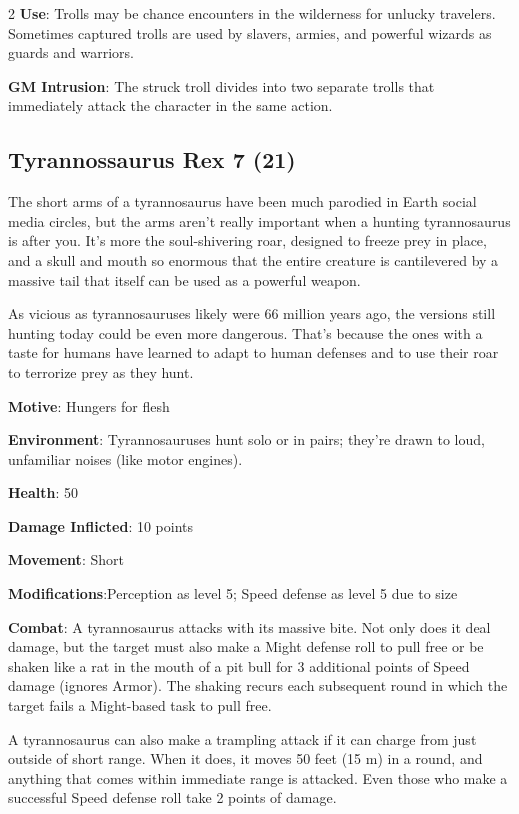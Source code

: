 \begin{multicols}{2}
\textbf{Use}: Trolls may be chance encounters in the wilderness for unlucky travelers. Sometimes captured trolls are used by slavers, armies, and powerful wizards as guards and warriors.

\textbf{GM Intrusion}: The struck troll divides into two separate trolls that immediately attack the character in the same action.

\subsection{Tyrannossaurus Rex 7 (21)}

The short arms of a tyrannosaurus have been much parodied in Earth social media circles, but the arms aren’t really important when a hunting tyrannosaurus is after you. It’s more the soul-shivering roar, designed to freeze prey in place, and a skull and mouth so enormous that the entire creature is cantilevered by a massive tail that itself can be used as a powerful weapon.

As vicious as tyrannosauruses likely were 66 million years ago, the versions still hunting today could be even more dangerous. That’s because the ones with a taste for humans have learned to adapt to human defenses and to use their roar to terrorize prey as they hunt.

\textbf{Motive}: Hungers for flesh

\textbf{Environment}: Tyrannosauruses hunt solo or in pairs; they’re drawn to loud, unfamiliar noises (like motor engines).

\textbf{Health}: 50

\textbf{Damage Inflicted}: 10 points

\textbf{Movement}: Short

\textbf{Modifications}:Perception as level 5; Speed defense as level 5 due to size

\textbf{Combat}: A tyrannosaurus attacks with its massive bite. Not only does it deal damage, but the target must also make a Might defense roll to pull free or be shaken like a rat in the mouth of a pit bull for 3 additional points of Speed damage (ignores Armor). The shaking recurs each subsequent round in which the target fails a Might-based task to pull free.

A tyrannosaurus can also make a trampling attack if it can charge from just outside of short range. When it does, it moves 50 feet (15 m) in a round, and anything that comes within immediate range is attacked. Even those who make a successful Speed defense roll take 2 points of damage.


\end{multicols}
